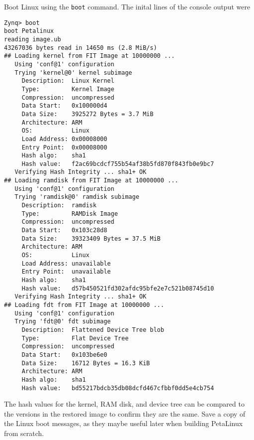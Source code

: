 \newpage
Boot Linux using the \verb+boot+ command. The inital lines of the console output were
%
\begin{verbatim}
Zynq> boot
boot Petalinux
reading image.ub
43267036 bytes read in 14650 ms (2.8 MiB/s)
## Loading kernel from FIT Image at 10000000 ...
   Using 'conf@1' configuration
   Trying 'kernel@0' kernel subimage
     Description:  Linux Kernel
     Type:         Kernel Image
     Compression:  uncompressed
     Data Start:   0x100000d4
     Data Size:    3925272 Bytes = 3.7 MiB
     Architecture: ARM
     OS:           Linux
     Load Address: 0x00008000
     Entry Point:  0x00008000
     Hash algo:    sha1
     Hash value:   f2ac69bcdcf755b54af38b5fd870f843fb0e9bc7
   Verifying Hash Integrity ... sha1+ OK
## Loading ramdisk from FIT Image at 10000000 ...
   Using 'conf@1' configuration
   Trying 'ramdisk@0' ramdisk subimage
     Description:  ramdisk
     Type:         RAMDisk Image
     Compression:  uncompressed
     Data Start:   0x103c28d8
     Data Size:    39323409 Bytes = 37.5 MiB
     Architecture: ARM
     OS:           Linux
     Load Address: unavailable
     Entry Point:  unavailable
     Hash algo:    sha1
     Hash value:   d57b450521fd302afdc95bfe2e7c521b08745d10
   Verifying Hash Integrity ... sha1+ OK
## Loading fdt from FIT Image at 10000000 ...
   Using 'conf@1' configuration
   Trying 'fdt@0' fdt subimage
     Description:  Flattened Device Tree blob
     Type:         Flat Device Tree
     Compression:  uncompressed
     Data Start:   0x103be6e0
     Data Size:    16712 Bytes = 16.3 KiB
     Architecture: ARM
     Hash algo:    sha1
     Hash value:   bd55217bdcb35db08dcfd467cfbbf0dd5e4cb754
\end{verbatim}
%
The hash values for the kernel, RAM disk, and device tree can be compared
to the versions in the restored image to confirm they are the same.
Save a copy of the Linux boot messages, as they maybe useful later when
building PetaLinux from scratch.

